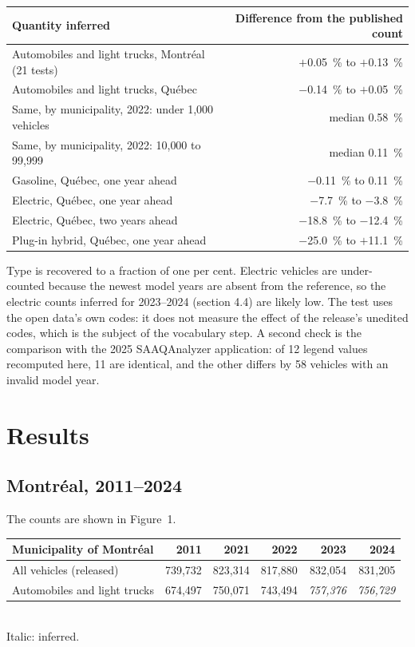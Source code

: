 \documentclass[10.5pt,a4paper]{article}
\begin{document}
\begin{center}\begin{tabular}{@{}lr@{}}\toprule
Quantity inferred & Difference from the published count \\\midrule
Automobiles and light trucks, Montréal (21 tests) & $+$0.05~\% to $+$0.13~\% \\
Automobiles and light trucks, Québec & $-$0.14~\% to $+$0.05~\% \\
Same, by municipality, 2022: under 1{,}000 vehicles & median 0.58~\% \\
Same, by municipality, 2022: 10{,}000 to 99{,}999 & median 0.11~\% \\\midrule
Gasoline, Québec, one year ahead & $-$0.11~\% to 0.11~\% \\
Electric, Québec, one year ahead & $-$7.7~\% to $-$3.8~\% \\
Electric, Québec, two years ahead & $-$18.8~\% to $-$12.4~\% \\
Plug-in hybrid, Québec, one year ahead & $-$25.0~\% to $+$11.1~\% \\\bottomrule
\end{tabular}\end{center}

Type is recovered to a fraction of one per cent. Electric vehicles are under-counted because the newest model years are absent from the reference, so the electric counts inferred for 2023--2024 (section 4.4) are likely low. The test uses the open data's own codes: it does not measure the effect of the release's unedited codes, which is the subject of the vocabulary step. A second check is the comparison with the 2025 SAAQAnalyzer application: of 12 legend values recomputed here, 11 are identical, and the other differs by 58 vehicles with an invalid model year.

\section{Results}
\subsection{Montréal, 2011--2024}
The counts are shown in Figure~1.
\begin{center}\begin{tabular}{@{}lrrrrr@{}}\toprule
Municipality of Montréal & 2011 & 2021 & 2022 & 2023 & 2024 \\\midrule
All vehicles (released) & 739{,}732 & 823{,}314 & 817{,}880 & 832{,}054 & 831{,}205 \\
Automobiles and light trucks & 674{,}497 & 750{,}071 & 743{,}494 & \textit{757{,}376} & \textit{756{,}729} \\\bottomrule
\end{tabular}\\[2pt]{\footnotesize Italic: inferred.}\end{center}
\end{document}
